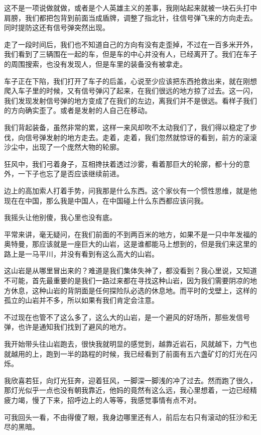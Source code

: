 这不是一项说做就做，或者是个人英雄主义的差事，我刚站起来就被一块石头打中肩膀，我们都把包背到前面当成盾牌，调整了指北针，往信号弹飞来的方向走去。同时提防这还有信号弹突然出现。

走了一段时间后，我们也不知道自己的方向有没有走歪掉，不过在一百多米开外，我们看到了三辆围在一起的车，但是车的中心并没有人，已经离开了。我们在车子的周围搜索，也没有发现人，但是车里的装备没有被拿走。

车子正在下陷，我们打开了车子的后盖，心说至少应该把东西抢救出来，就在刚想爬入车子里的时候，又有信号弹闪了起来，在我们很远的地方掠了过去。这一闪，我们发现发射信号弹的地方变成了在我们的左边，离我们并不是很远。看样子我们的方向确实歪了。或者是发射的人自己在移动。

我们背起装备，虽然非常的累，这样一来风却吹不太动我们了，我们得以稳定了步伐，向信号弹发射的地方走去。走着，走着，我们忽然就惊讶的看到，前方的滚滚沙尘中，出现了一个庞然大物的轮廓。

狂风中，我们弓着身子，互相搀扶着透过沙雾，看着那巨大的轮廓，都十分的意外，一下子也忘了是否应该继续前进。

边上的高加索人打着手势，问我那是什么东西。这个家伙有一个惯性思维，就是他现在在中国，那么我是中国人，在中国碰上什么东西都应该问我。

我摇头让他别傻，我心里也没有底。

平常来讲，毫无疑问，在我们前面的不到两百米的地方，如果不是一只中年发福的奥特曼，那应该就是一座巨大的山岩，这是谁都能马上想到的，但是我们来这里的路上是一马平川，并没有看到有这么高大的山岩。

这山岩是从哪里冒出来的？难道是我们集体失神了，都没看到？我心里说，又知道不可能，首先最重要的是我们一路过来都在寻找这种山岩，因为我们需要阴凉的地方休息，这种山岩的背阴面是任何探险队必选的休息地。而平时的戈壁上，这样的孤立的山岩并不多，所以如果有我们肯定会注意。

不过现在也管不了这么多了，这么大的山岩，是一个避风的好场所，那些发信号弹，也许是通知我们找到了避风的地方。

我开始带头往山岩跑去，很快我就明显的感觉到，越靠近岩石，风就越下，力气也就越用的上，跑到一半的路程的时候，我已经看到了前面有五六盏矿灯的灯光在闪烁。

我欣喜若狂，向灯光狂奔，迎着狂风，一脚深一脚浅的冲了过去。然而跑了很久，那灯光似乎一点也没有朝我靠近，他妈的竟然有这么远，我心里想着，一边已经精疲力竭，慢了下来，招呼边上的人等等，我感觉事情有点不对。

可我回头一看，不由得傻了眼，我身边哪里还有人，前后左右只有滚动的狂沙和无尽的黑暗。

